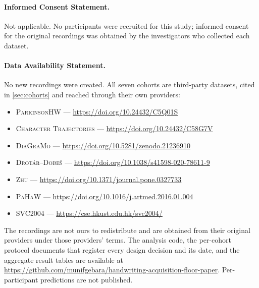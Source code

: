 \paragraph{Informed Consent Statement.} Not applicable. No participants were recruited for this
study; informed consent for the original recordings was obtained by the investigators who collected
each dataset.

\begingroup\sloppy
\paragraph{Data Availability Statement.} No new recordings were created. All seven cohorts are
third-party datasets, cited in \cref{sec:cohorts} and reached through their own providers:

\begin{itemize}\setlength{\itemsep}{0pt}
\item \textsc{ParkinsonHW} --- \url{https://doi.org/10.24432/C5Q01S}
\item \textsc{Character Trajectories} --- \url{https://doi.org/10.24432/C58G7V}
\item \textsc{DiaGraMo} --- \url{https://doi.org/10.5281/zenodo.21236910}
\item \textsc{Drot\'ar--Dobe\v{s}} --- \url{https://doi.org/10.1038/s41598-020-78611-9}
\item \textsc{Zhu} --- \url{https://doi.org/10.1371/journal.pone.0327733}
\item \textsc{PaHaW} --- \url{https://doi.org/10.1016/j.artmed.2016.01.004}
\item \textsc{SVC2004} --- \url{https://cse.hkust.edu.hk/svc2004/}
\end{itemize}

\noindent The recordings are not ours to redistribute and are
obtained from their original providers under those providers' terms. The analysis code, the
per-cohort protocol documents that register every design decision and its date, and the aggregate
result tables are available at \url{https://github.com/munifgebara/handwriting-acquisition-floor-paper}.
Per-participant predictions are not published.
\endgroup


